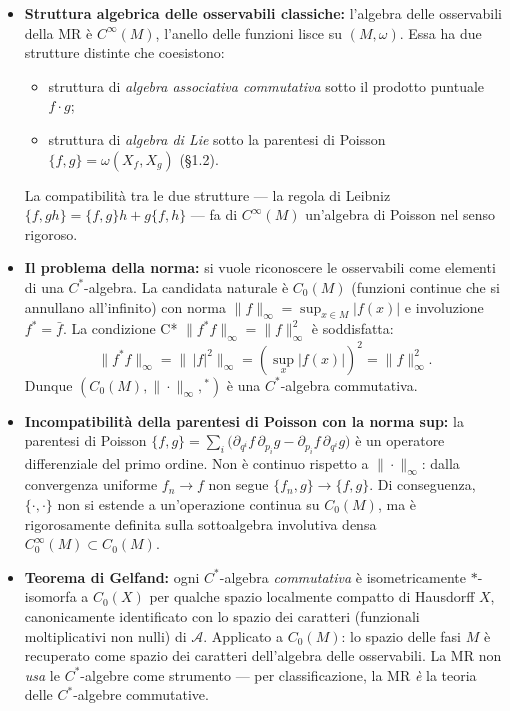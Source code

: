 \documentclass[12pt, a4paper]{article}
\begin{document}
\begin{itemize}
	\item \textbf{Struttura algebrica delle osservabili classiche:}
	l'algebra delle osservabili della MR è $C^\infty(M)$, l'anello
	delle funzioni lisce su $(M,\omega)$. Essa ha due strutture distinte
	che coesistono:
	\begin{itemize}
		\item[(i)] struttura di \emph{algebra associativa commutativa} sotto il
		prodotto puntuale $f \cdot g$;
		\item[(ii)] struttura di \emph{algebra di Lie} sotto la parentesi di Poisson
		$\{f,g\} = \omega(X_f, X_g)$ (§1.2).
	\end{itemize}
	La compatibilità tra le due strutture --- la regola di Leibniz
	$\{f, gh\} = \{f,g\}h + g\{f,h\}$ --- fa di $C^\infty(M)$ un'algebra
	di Poisson nel senso rigoroso.
	
	\item \textbf{Il problema della norma:} si vuole riconoscere le osservabili
	come elementi di una $C^*$-algebra. La candidata naturale è
	$C_0(M)$ (funzioni continue che si annullano all'infinito) con norma
	$\|f\|_\infty = \sup_{x \in M} |f(x)|$ e involuzione $f^* = \bar{f}$.
	La condizione C* $\|f^*f\|_\infty = \|f\|_\infty^2$ è soddisfatta:
	\[
	\|f^*f\|_\infty = \|\,|f|^2\|_\infty = \left(\sup_{x}|f(x)|\right)^2 = \|f\|_\infty^2.
	\]
	Dunque $(C_0(M), \|\cdot\|_\infty, {}^*)$ è una $C^*$-algebra commutativa.
	
	\item \textbf{Incompatibilità della parentesi di Poisson con la norma sup:}
	la parentesi di Poisson $\{f,g\} = \sum_i \bigl(\partial_{q^i}f\,\partial_{p_i}g
	- \partial_{p_i}f\,\partial_{q^i}g\bigr)$ è un operatore differenziale del
	primo ordine. Non è continuo rispetto a $\|\cdot\|_\infty$: dalla convergenza
	uniforme $f_n \to f$ non segue $\{f_n,g\} \to \{f,g\}$. Di conseguenza,
	$\{\cdot,\cdot\}$ non si estende a un'operazione continua su $C_0(M)$, ma
	è rigorosamente definita sulla sottoalgebra involutiva densa
	$C_0^\infty(M) \subset C_0(M)$.
	
	\item \textbf{Teorema di Gelfand:} ogni $C^*$-algebra \emph{commutativa}
	è isometricamente $*$-isomorfa a $C_0(X)$ per qualche spazio localmente
	compatto di Hausdorff $X$, canonicamente identificato con lo spazio dei
	caratteri (funzionali moltiplicativi non nulli) di $\mathcal{A}$. Applicato
	a $C_0(M)$: lo spazio delle fasi $M$ è recuperato come spazio dei caratteri
	dell'algebra delle osservabili. La MR non \emph{usa} le $C^*$-algebre come
	strumento --- per classificazione, la MR \emph{è} la teoria delle $C^*$-algebre
	commutative.
	

\end{itemize}
\end{document}
